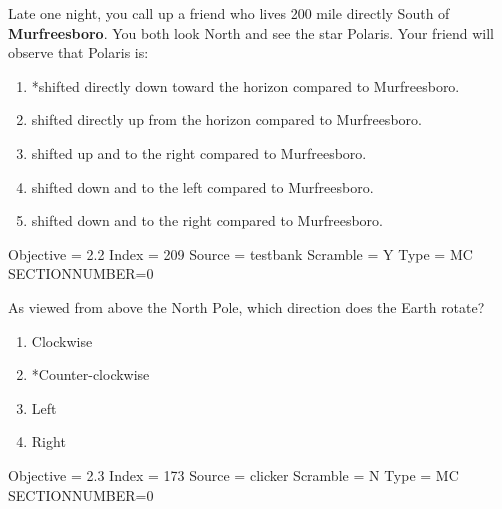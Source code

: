 \documentclass[11pt]{article}
\begin{document}
\begin{enumerate}
\begin{minipage}{\textwidth}
\begin{minipage}{\textwidth}
\item Late one night, you call up a friend who lives 200 mile directly South of {\bf Murfreesboro}.   You both look North and see the star Polaris.  Your friend will observe that Polaris is:
\begin{enumerate} 
\setlength{\itemsep}{1pt} 
\setlength{\parskip}{0pt} 
\setlength{\parsep}{0pt}
\setlength{\multicolsep}{1pt} 
\item *shifted directly down toward the horizon compared to Murfreesboro.
\item shifted directly up from the horizon compared to  Murfreesboro.
\item shifted up and to the right compared to Murfreesboro.
\item shifted down and to the left  compared to Murfreesboro.
\item shifted down and to the right compared to Murfreesboro.
\end{enumerate} 
Objective = 2.2
Index = 209
Source = testbank
Scramble = Y
Type = MC
SECTIONNUMBER=0
\end{minipage}
\end{minipage}
\vskip 0.20in

\begin{minipage}{\textwidth}
\begin{minipage}{\textwidth}
\item As viewed from above the North Pole, which direction does the Earth rotate?
\begin{multicols}{3}
\begin{enumerate} 
\setlength{\itemsep}{1pt} 
\setlength{\parskip}{0pt} 
\setlength{\parsep}{0pt}
\setlength{\multicolsep}{1pt} 
\item Clockwise
\item *Counter-clockwise
\item Left
\item Right
\end{enumerate} 
\vfill 
\end{multicols}

Objective = 2.3
Index = 173
Source = clicker
Scramble = N
Type = MC
SECTIONNUMBER=0
\end{minipage}
\end{minipage}
\vskip 0.20in


\end{enumerate}
\end{document}

